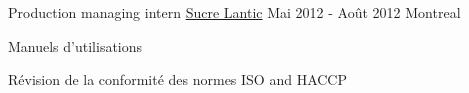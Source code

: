 \begin{cventries}
  \cventry
    {Production managing intern} %
    {\href{https://www.lanticrogers.com/}{Sucre Lantic}} %
    {Mai 2012 - Août 2012} %
    {Montreal} %
    {
      \begin{cvitems} %
        \item {Manuels d'utilisations}
        \item {Révision de la conformité des normes ISO and HACCP}
      \end{cvitems}
    }

\end{cventries}
